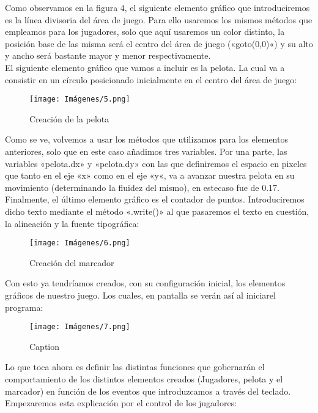 \documentclass[journal]{IEEEtran}
\begin{document}
Como observamos en la figura 4, el siguiente elemento gráfico que introduciremos es la línea divisoria del área de juego. Para ello usaremos los mismos métodos que empleamos para los jugadores, solo que aquí usaremos un color distinto, la posición base de las misma será el centro del área de juego («goto(0,0)«) y su alto y ancho será bastante mayor y menor respectivamente.\\



El siguiente elemento gráfico que vamos a incluir es la pelota. La cual va a consistir en un círculo posicionado inicialmente en el centro del área de juego:

\begin{figure}[ht]
    \centering
    \texttt{[image: Imágenes/5.png]}
    \caption{Creación de la pelota}
    \label{fig:my_label}
\end{figure}

Como se ve, volvemos a usar los métodos que utilizamos para los elementos anteriores, solo que en este caso añadimos tres variables. Por una parte, las variables «pelota.dx» y «pelota.dy» con las que definiremos el espacio en pixeles que tanto en el eje «x» como en el eje «y«, va a avanzar nuestra pelota en su movimiento (determinando la fluidez del mismo), en estecaso fue de 0.17.\\


Finalmente, el último elemento gráfico es el contador de puntos. Introduciremos dicho texto mediante el método «.write()» al que pasaremos el texto en cuestión, la alineación y la fuente tipográfica:

\begin{figure}[ht]
    \centering
    \texttt{[image: Imágenes/6.png]}
    \caption{Creación del marcador}
    \label{fig:my_label}
\end{figure}

Con esto ya tendríamos creados, con su configuración inicial, los elementos gráficos de nuestro juego. Los cuales, en pantalla se verán así al iniciarel programa:

\begin{figure}[ht]
    \centering
    \texttt{[image: Imágenes/7.png]}
    \caption{Caption}
    \label{fig:my_label}
\end{figure}

Lo que toca ahora es definir las distintas funciones que gobernarán el comportamiento de los distintos elementos creados (Jugadores, pelota y el marcador) en función de los eventos que introduzcamos a través del teclado. Empezaremos esta explicación por el control de los jugadores:
\end{document}
